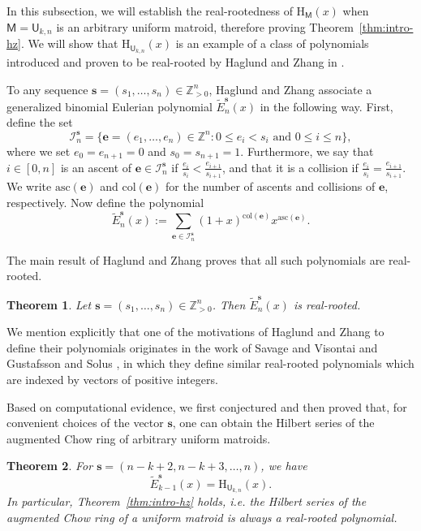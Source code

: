 \documentclass[11pt, a4paper, english]{amsart}
\theoremstyle{teoremas}
\newtheorem{theorem}{Theorem}[section]
\theoremstyle{definition}
\newcommand{\M}{\mathsf{M}}
\newcommand{\U}{\mathsf{U}}
\newcommand{\cI}{\mathcal{I}}
\newcommand{\Z}{\mathbb{Z}}
\renewcommand{\H}{\mathrm{H}}
\begin{document}
In this subsection, we will establish the real-rootedness of $\H_\M(x)$ when $\M = \U_{k,n}$ is an arbitrary uniform matroid, therefore proving Theorem~\ref{thm:intro-hz}. We will show that $\H_{\U_{k,n}}(x)$ is an example of a class of polynomials introduced and proven to be real-rooted by Haglund and Zhang in \cite{haglund-zhang}.

To any sequence $\mathbf{s} = (s_1,\ldots,s_n) \in \Z_{>0}^n$, Haglund and Zhang associate a generalized binomial Eulerian polynomial $\widetilde{E}_n^{\mathbf{s}}(x)$ in the following way.  First, define the set 
    \[
    \cI_n^{\mathbf{s}} = \{\mathbf{e} = (e_1,\ldots, e_n) \in \Z^n : 0 \le e_i < s_i \text{ and } 0 \le i \le n\},
    \]
where we set $e_0 = e_{n+1} = 0$ and $s_0 = s_{n+1} = 1$.  Furthermore, we say that $i \in [0,n]$ is an ascent of $\mathbf{e} \in \cI_n^{\mathbf{s}}$ if $\frac{e_i}{s_i} < \frac{e_{i+1}}{s_{i+1}}$, and that it is a collision if $\frac{e_i}{s_i} = \frac{e_{i+1}}{s_{i+1}}$.  We write $\mathrm{asc}(\mathbf{e})$ and $\mathrm{col}(\mathbf{e})$ for the number of ascents and collisions of $\mathbf{e}$, respectively.  Now define the polynomial
\[
\widetilde{E}_n^{\mathbf{s}}(x) := \sum_{\mathbf{e} \in \cI_n^{\mathbf{s}}} (1+x)^{\mathrm{col}(\mathbf{e})}x^{\mathrm{asc}(\mathbf{e})}.
\]

The main result of Haglund and Zhang \cite[Theorem~1.1]{haglund-zhang} proves that all such polynomials are real-rooted.

\begin{theorem}\label{thm:hz}
    Let $\mathbf{s} = (s_1,\ldots,s_n) \in \Z_{>0}^n$.  Then $\widetilde{E}_n^{\mathbf{s}}(x)$ is real-rooted.
\end{theorem}

We mention explicitly that one of the motivations of Haglund and Zhang to define their polynomials originates in the work of Savage and Visontai \cite{savage-visontai} and Gustafsson and Solus \cite{gustafsson-solus}, in which they define similar real-rooted polynomials which are indexed by vectors of positive integers. 

Based on computational evidence, we first conjectured and then proved that, for convenient choices of the vector $\mathbf{s}$, one can obtain the Hilbert series of the augmented Chow ring of arbitrary uniform matroids.

\begin{theorem}\label{thm:unifrealrooted}
    For $\mathbf{s} = (n - k + 2, n - k + 3, \dots, n)$, we have
    \begin{equation*}
      \widetilde{E}^{\mathbf s}_{k-1}(x) = \H_{\U_{k, n}}(x).
  \end{equation*}
  In particular, Theorem~\ref{thm:intro-hz} holds, i.e. the Hilbert series of the augmented Chow ring of a uniform matroid is always a real-rooted polynomial.
\end{theorem}
\end{document}
